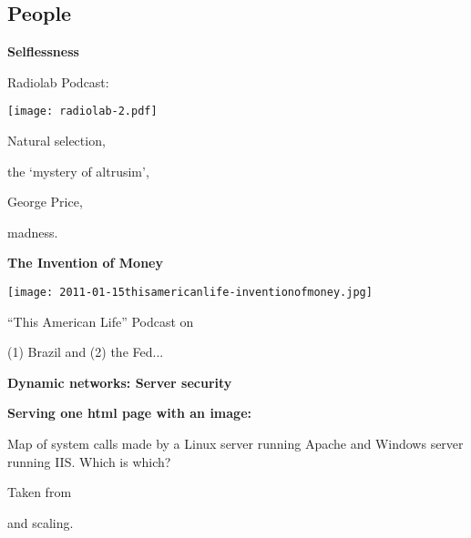 \subsection{People}

  \textbf{Selflessness}

  Radiolab Podcast: 
  \bigskip
      
    \texttt{[image: radiolab-2.pdf]}
    
    
     
      Natural selection, 
     
      the `mystery of altrusim', 
     
      George Price, 
     
      madness.
    
  

  \textbf{The Invention of Money}

      
    \texttt{[image: 2011-01-15thisamericanlife-inventionofmoney.jpg]}
    
    
     
      ``This American Life''
      Podcast on 
     
      (1) Brazil and (2) the Fed...
    
  


  \textbf{Dynamic networks: Server security}

  \textbf{Serving one html page with an image:}
    \bigskip
    \setlength\fboxsep{0pt}
    \setlength\fboxrule{1pt}
    
     
      Map of system calls made by a Linux server running Apache and
      Windows server running IIS.  Which is which?
    
  
  {\tiny
  Taken from }
  

  
  
  and scaling.

